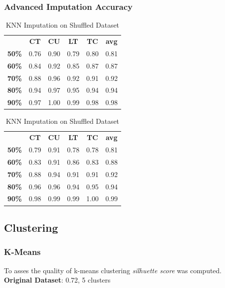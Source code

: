 \documentclass{article}
\begin{document}
\subsubsection{Advanced Imputation Accuracy}
\begin{table}[h]
\begin{minipage}{.45\textwidth}\centering
\begin{tabular}{cccccc}
			  & \textbf{CT} & \textbf{CU} & \textbf{LT} & \textbf{TC} & \textbf{avg} \\
\textbf{50\%} & 0.76        & 0.90        & 0.79        & 0.80        & 0.81 \\
\textbf{60\%} & 0.84        & 0.92        & 0.85        & 0.87        & 0.87 \\
\textbf{70\%} & 0.88        & 0.96        & 0.92        & 0.91        & 0.92 \\
\textbf{80\%} & 0.94        & 0.97        & 0.95        & 0.94        & 0.94 \\
\textbf{90\%} & 0.97        & 1.00        & 0.99        & 0.98        & 0.98
\end{tabular}
\caption{KNN Imputation}
\end{minipage}
\hfill
\begin{minipage}{.5\textwidth}\centering
\begin{tabular}{cccccc}
			  & \textbf{CT} & \textbf{CU} & \textbf{LT} & \textbf{TC} & \textbf{avg} \\
\textbf{50\%} & 0.79        & 0.91        & 0.78        & 0.78        & 0.81 \\
\textbf{60\%} & 0.83        & 0.91        & 0.86        & 0.83        & 0.88 \\
\textbf{70\%} & 0.88        & 0.94        & 0.91        & 0.91        & 0.92 \\
\textbf{80\%} & 0.96        & 0.96        & 0.94        & 0.95        & 0.94 \\
\textbf{90\%} & 0.98        & 0.99        & 0.99        & 1.00        & 0.99
\end{tabular}
\caption{KNN Imputation on Shuffled Dataset}
\end{minipage}
\end{table}

\subsection{Clustering}
\subsubsection{K-Means}
To asses the quality of k-means clustering \emph{silhuette score} was computed.\\
\textbf{Original Dataset}: 0.72, 5 clusters
\end{document}
